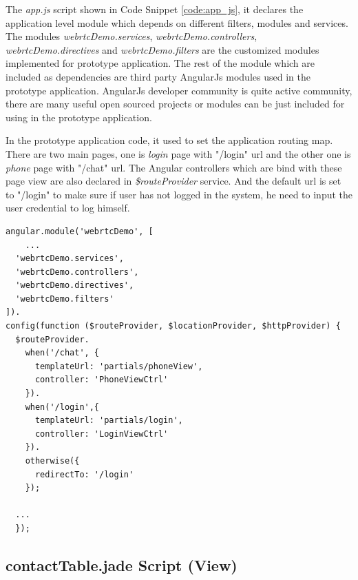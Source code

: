 \par The \textit{app.js} script shown in Code Snippet \ref{code:app_js}, it declares the application level module which depends on different filters, modules and services. The modules \textit{webrtcDemo.services}, \textit{webrtcDemo.controllers}, \textit{webrtcDemo.directives} and \textit{webrtcDemo.filters} are the customized modules implemented for prototype application. The rest of the module which are included as dependencies are third party AngularJs modules used in the prototype application. AngularJs developer community is quite active community, there are many useful open sourced projects or modules can be just included for using in the prototype application.

\par In the prototype application code, it used to set the application routing map. There are two main pages, one is \textit{login} page with "/login" \gls{url} and the other one is \textit{phone} page with "/chat" \gls{url}. The Angular controllers which are bind with these page view are also declared in \textit{\$routeProvider} service. And the default \gls{url} is set to "/login" to make sure if user has not logged in the system, he need to input the user credential to log himself. 

\label{app:app_js}
\begin{lstlisting}[caption={app.js in application client},label={code:app_js}]
angular.module('webrtcDemo', [
    ...
  'webrtcDemo.services',
  'webrtcDemo.controllers',
  'webrtcDemo.directives',
  'webrtcDemo.filters'
]).
config(function ($routeProvider, $locationProvider, $httpProvider) {
  $routeProvider.
    when('/chat', {
      templateUrl: 'partials/phoneView',
      controller: 'PhoneViewCtrl'
    }).
    when('/login',{
      templateUrl: 'partials/login',
      controller: 'LoginViewCtrl'
    }).
    otherwise({
      redirectTo: '/login'
    });

  ...
  });

\end{lstlisting}

\subsection{contactTable.jade Script (View)}

